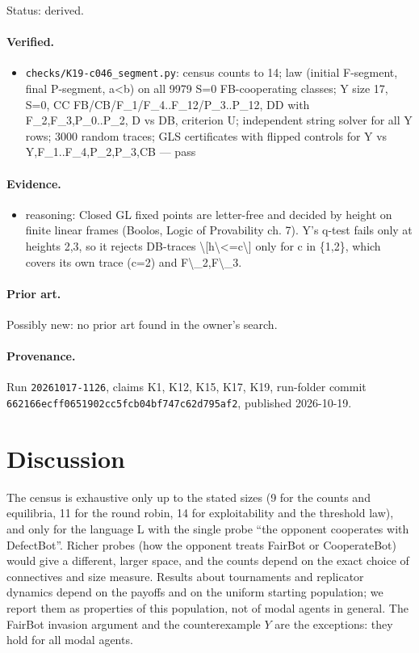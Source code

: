 \documentclass{article}
\begin{document}
Status: derived.

\paragraph{Verified.}
\begin{itemize}
\item \texttt{checks/K19-c046\_segment.py}: census counts to 14; law (initial F-segment, final P-segment, a\textless{}b) on all 9979 S=0 FB-cooperating classes; Y size 17, S=0, CC FB/CB/F\_1/F\_4..F\_12/P\_3..P\_12, DD with F\_2,F\_3,P\_0..P\_2, D vs DB, criterion U; independent string solver for all Y rows; 3000 random traces; GLS certificates with flipped controls for Y vs Y,F\_1..F\_4,P\_2,P\_3,CB --- pass
\end{itemize}

\paragraph{Evidence.}
\begin{itemize}
\item reasoning: Closed GL fixed points are letter-free and decided by height on finite linear frames (Boolos, Logic of Provability ch. 7). Y's q-test fails only at heights 2,3, so it rejects DB-traces \textbackslash{}[h\textbackslash{}\textless{}=c\textbackslash{}] only for c in \{1,2\}, which covers its own trace (c=2) and F\textbackslash{}\_2,F\textbackslash{}\_3.
\end{itemize}

\paragraph{Prior art.} Possibly new: no prior art found in the owner's search.


\paragraph{Provenance.}
Run \texttt{20261017-1126}, claims K1, K12, K15, K17, K19, run-folder commit \texttt{662166ecff0651902cc5fcb04bf747c62d795af2}, published 2026-10-19.

\section{Discussion}

The census is exhaustive only up to the stated sizes (9 for the counts and equilibria, 11 for
the round robin, 14 for exploitability and the threshold law), and only for the language L with
the single probe ``the opponent cooperates with DefectBot''. Richer probes (how the opponent
treats FairBot or CooperateBot) would give a different, larger space, and the counts depend on
the exact choice of connectives and size measure. Results about tournaments and replicator
dynamics depend on the payoffs and on the uniform starting population; we report them as
properties of this population, not of modal agents in general. The FairBot invasion argument and
the counterexample $Y$ are the exceptions: they hold for all modal agents.
\end{document}
